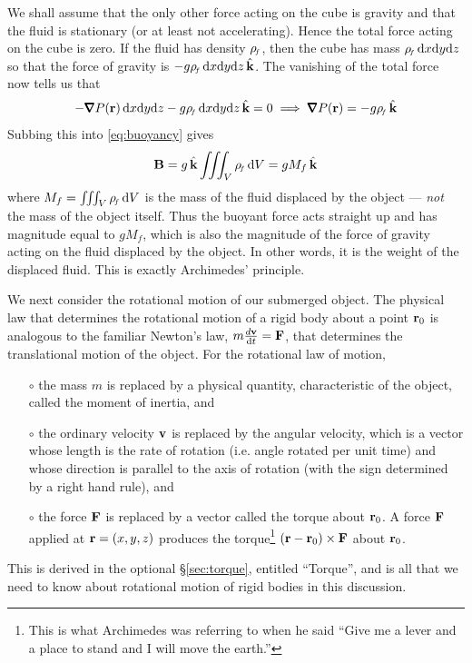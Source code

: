 We shall assume that the only other force acting on the cube is gravity
and that the fluid is stationary (or at least not accelerating).
Hence the total force acting on the cube is zero. If the fluid has density
${\rho_{\!{\scriptscriptstyle f}}}$, then the  cube has mass ${\rho_{\!{\scriptscriptstyle f}}}\, \mathrm{d}x\mathrm{d}y\mathrm{d}z$ so that the force of 
gravity is $- g{\rho_{\!{\scriptscriptstyle f}}}\,  \mathrm{d}x\mathrm{d}y\mathrm{d}z\,\hat{\mathbf{k}}$. The vanishing of 
the total force now tells us that
\begin{equation*}
-\vnabla P(\vr)\, \dee{x} \dee{y} \dee{z}
- g\rhof\,  \dee{x} \dee{y} \dee{z}\,\hk=0
\implies \vnabla P(\vr)= - g\rhof  \,\hk
\end{equation*}
Subbing this into \eqref{eq:buoyancy} gives
\begin{equation*}
\mathbf{B}= g\,\hat{\mathbf{k}}\iiint_{V}{\rho_{\!{\scriptscriptstyle f}}}\,\mathrm{d}V = gM_f\,\hat{\mathbf{k}}
\end{equation*}
where $M_f =\iiint_V {\rho_{\!{\scriptscriptstyle f}}}\,\mathrm{d}V$ is the mass of the fluid 
displaced by the object --- \emph{not} the mass of the object itself. 
Thus the buoyant force acts straight up and has magnitude equal to
$gM_f $, which is also the magnitude of the force of gravity acting on the 
fluid displaced by the object. In other words, it is the weight of the 
displaced fluid. This is exactly Archimedes' principle. 

We next consider the rotational motion of our submerged object. The physical
law that determines the rotational motion of a rigid body about a point
$\mathbf{r}_0$ is analogous to the familiar Newton's law, $m\frac{d\mathbf{v}}{\mathrm{d}t}=\mathbf{F}$, 
that determines the translational motion of the object. For the rotational
law of motion, 
\begin{itemize}\itemsep1pt \parskip0pt  %
\item[$\circ$]
the mass $m$ is replaced by a physical quantity, characteristic
of the object, called the moment of inertia, and
\item[$\circ$] 
the ordinary velocity $\mathbf{v}$ is replaced by the angular 
velocity, which is a vector whose length is the rate of rotation (i.e.
angle rotated per unit time) and whose direction is parallel to the axis
of rotation (with the sign determined by a right hand rule), and 
\item[$\circ$] the force $\mathbf{F}$ 
is replaced by a vector called the torque about $\mathbf{r}_0$.  A force $\mathbf{F}$ applied 
at $\mathbf{r}=(x,y,z)$ produces the torque\footnote{This is what Archimedes was referring to when he said ``Give me a lever and a place to stand and I will move the earth.''} $(\mathbf{r}-\mathbf{r}_0)\times\mathbf{F}$ about $\mathbf{r}_0$. 
\end{itemize}
This is derived in the optional \S\ref{sec:torque}, entitled ``Torque'', 
and is all that we need to know about rotational motion of rigid bodies in 
this discussion.

